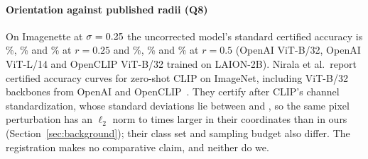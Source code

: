 

\paragraph{Orientation against published radii (Q8)}
On Imagenette at $\sigma=0.25$ the uncorrected model's standard
certified accuracy is \FUQEightOBthirtytwoQuarter\%, \FUQEightOLfourteenQuarter\% and
\FUQEightLBthirtytwoQuarter\% at $r=0.25$ and
\FUQEightOBthirtytwoHalf\%, \FUQEightOLfourteenHalf\% and
\FUQEightLBthirtytwoHalf\% at $r=0.5$ (OpenAI ViT-B/32, OpenAI ViT-L/14 and
OpenCLIP ViT-B/32 trained on LAION-2B). Nirala et al.\ report certified
accuracy curves for zero-shot CLIP on ImageNet, including ViT-B/32 backbones
from OpenAI and OpenCLIP~\cite{nirala2024ovc}. They certify after CLIP's
channel standardization, whose standard deviations lie between
\FUClipStdLo{} and \FUClipStdHi{}, so the same pixel perturbation has an
$\ell_2$ norm \FUClipScaleLo{} to \FUClipScaleHi{} times larger in their
coordinates than in ours (Section~\ref{sec:background}); their class set and
sampling budget also differ. The registration makes no comparative claim, and
neither do we.



